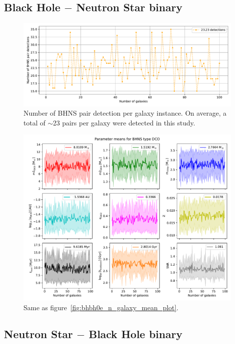 \subsection{Black Hole $-$ Neutron Star binary}
\begin{figure}[!h]
    \centering
    \includegraphics[width=\columnwidth]{analysis_data/004__images_for_latex/BHNS0e_n_detections}
    \caption{Number of BHNS pair detection per galaxy instance. On average, a total of $\sim$23 pairs per galaxy were detected in this study.}
    \label{fig:bhns0endetections}
\end{figure}

\begin{figure}[!h]
    \centering
    \includegraphics[width=\columnwidth]{analysis_data/004__images_for_latex/BHNS0e_n_galaxy_mean_plot}
    \caption{Same as figure~\ref{fig:bhbh0e_n_galaxy_mean_plot}.}
    \label{fig:bhns0e_n_galaxy_mean_plot}
\end{figure}

\newpage
\subsection{Neutron Star $-$ Black Hole binary}

